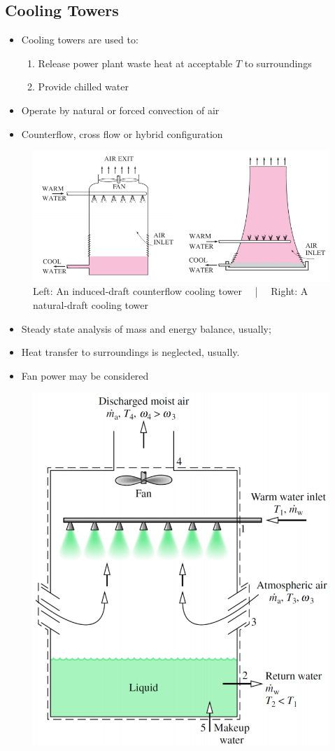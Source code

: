 \documentclass[class=report, crop=false, 12pt,a4paper]{standalone}
\numberwithin{equation}{section}
\begin{document}
\subsection{Cooling Towers}
\begin{itemize}[noitemsep]
  \item Cooling towers are used to:
  \begin{enumerate}[noitemsep]
    \item Release power plant waste heat at acceptable $T$ to surroundings
    \item Provide chilled water
  \end{enumerate}
  \item Operate by natural or forced convection of air
  \item Counterflow, cross flow or hybrid configuration
\end{itemize}
\begin{figure}[H]
  \centering
  \includegraphics[width = 0.9 \textwidth]{../img/diagram125.png}
  \caption{Left: An induced-draft counterflow cooling tower \ \ | \ \ Right: A natural-draft cooling tower}
\end{figure}
\begin{itemize}[noitemsep]
  \item Steady state analysis of mass and energy balance, usually;
  \item Heat transfer to surroundings is neglected, usually.
  \item Fan power may be considered
\end{itemize}
\begin{figure}[H]
  \centering
  \includegraphics[width = 0.53 \textwidth]{../img/diagram126.png}
  \caption{}
\end{figure}
\end{document}
